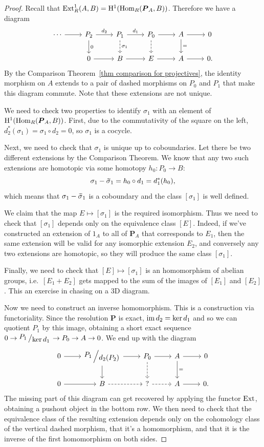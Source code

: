 \begin{proof}
    Recall that $\operatorname{Ext}^1_R(A,B)=\mathrm{H}^1(\operatorname{Hom}_R(\boldsymbol{P}_A,B))$. Therefore we have a diagram
    \[\begin{tikzcd}
        \cdots \arrow[r]&P_2\arrow[r,"d_2"]\arrow[d,"0"] & P_1\arrow[r,"d_1"]\arrow[d,dashed,"\sigma_1"] & P_0 \arrow[r]\arrow[d,dashed] & A\arrow[r]\arrow[d,"="] & 0 \\
        & 0\arrow[r] & B\arrow[r] & E \arrow[r] & A\arrow[r] & 0.
    \end{tikzcd}\]
    By the Comparison Theorem~\ref{thm comparison for projectives}, the identity morphism on $A$ extends to a pair of dashed morphisms on $P_0$ and $P_1$ that make this diagram commute. Note that these extensions are not unique. 

    We need to check two properties to identify $\sigma_1$ with an element of $\mathrm{H}^1(\operatorname{Hom}_R(\boldsymbol{P}_A,B))$. First, due to the commutativity of the square on the left, $d_2^\ast(\sigma_1)=\sigma_1\circ d_2=0$, so $\sigma_1$ is a cocycle. 

    Next, we need to check that $\sigma_1$ is unique up to coboundaries. Let there be two different extensions by the Comparison Theorem. We know that any two such extensions are homotopic via some homotopy $h_0:P_0\to B$:
    \[\sigma_1-\wt{\sigma}_1=h_0\circ d_1=d_1^\ast(h_0),\]
    which means that $\sigma_1-\wt{\sigma}_1$ is a coboundary and the class $[\sigma_1]$ is well defined.

    We claim that the map $E\mapsto [\sigma_1]$ is the required isomorphism. Thus we need to check that $[\sigma_1]$ depends only on the equivalence class $[E]$. Indeed, if we've constructed an extension of $1_A$ to all of $\bm{P}_A$ that corresponds to $E_1$, then the same extension will be valid for any isomorphic extension $E_2$, and conversely any two extensions are homotopic, so they will produce the same class $[\sigma_1]$.

    Finally, we need to check that $[E]\mapsto [\sigma_1]$ is an homomorphism of abelian groups, i.e.~$[E_1+E_2]$ gets mapped to the sum of the images of $[E_1]$ and $[E_2]$. This an exercise in chasing on a 3D diagram.

    Now we need to construct an inverse homomorphism. This is a construction via functoriality. Since the resolution $\bm{P}$ is exact, $\operatorname{im} d_2=\ker d_1$ and so we can quotient $P_1$ by this image, obtaining a short exact sequence $0\to \bigslant{P_1}{\ker d_1} \to P_0\to A\to 0$. We end up with the diagram
    \[\begin{tikzcd}
        0\arrow[r] & \bigslant{P_1}{d_2(P_2)}\arrow[r]\arrow[d] & P_0 \arrow[r]\arrow[d,dashed] & A\arrow[r]\arrow[d,"="] & 0 \\
        0\arrow[r] & B\arrow[r,dashed] & ? \arrow[r,dashed] & A\arrow[r] & 0.
    \end{tikzcd}\]
    The missing part of this diagram can get recovered by applying the functor $\operatorname{Ext}$, obtaining a pushout object in the bottom row. We then need to check that the equivalence class of the resulting extension depends only on the cohomology class of the vertical dashed morphism, that it's a homomorphism, and that it is the inverse of the first homomorphism on both sides.
\end{proof}
